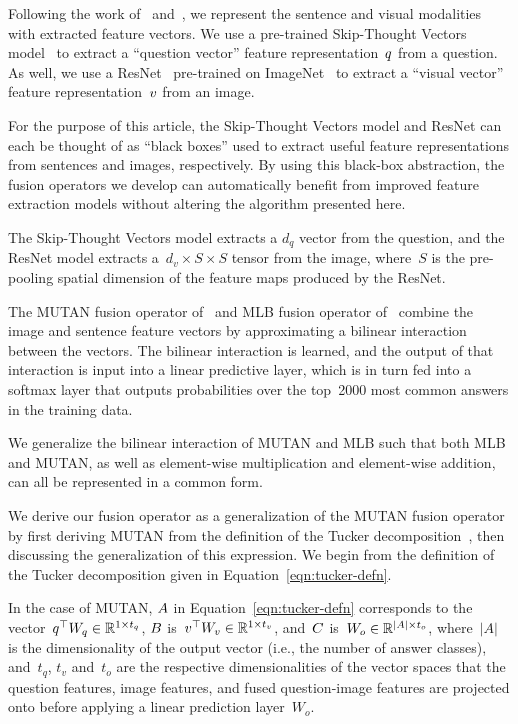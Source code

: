 Following the work of~\citet{Kim2017} and~\citet{ben2017mutan}, we represent the
sentence and visual modalities with extracted feature vectors. We use a
pre-trained Skip-Thought Vectors model~\citep{kiros2015skip}
to extract a ``question vector'' feature representation~$q$ from a question.
As well, we use a ResNet~\citep{he2016deep} pre-trained on
ImageNet~\citep{russakovsky2015imagenet} to extract a ``visual vector'' feature
representation~$v$ from an image.

For the purpose of this article, the Skip-Thought Vectors model and ResNet can
each be thought of as ``black boxes'' used to extract useful feature
representations from sentences and images, respectively. By using this
black-box abstraction, the fusion operators we develop can automatically
benefit from improved feature extraction models without altering the algorithm
presented here.

The Skip-Thought Vectors model extracts a $d_q$ vector from the question, and
the ResNet model extracts a~$d_v \times S \times S$ tensor from the image,
where~$S$ is the pre-pooling spatial dimension of the feature maps produced by
the ResNet.

The MUTAN fusion operator of~\citet{ben2017mutan} and MLB fusion operator
of~\citet{Kim2017} combine the image and sentence feature vectors by
approximating a bilinear interaction between the vectors. The bilinear
interaction is learned, and the output of that interaction is input into a
linear predictive layer, which is in turn fed into a softmax layer that outputs
probabilities over the top~\num{2000} most common answers in the training data.

We generalize the bilinear interaction of MUTAN and MLB such that both MLB and
MUTAN, as well as element-wise multiplication and element-wise addition, can
all be represented in a common form.

We derive our fusion operator as a generalization of the MUTAN fusion operator
by first deriving MUTAN from the definition of the Tucker
decomposition~\citep{kolda2009tensor}, then discussing the generalization of
this expression.  We begin from the definition of the Tucker decomposition
given in Equation~\ref{eqn:tucker-defn}.

In the case of MUTAN, $A$ in Equation~\ref{eqn:tucker-defn} corresponds to the
vector~$q^\top{} W_{q}{} \in \mathbb{R}^{1 \times t_q}$, $B$
is~$v^\top{} W_{v}{} \in \mathbb{R}^{1 \times t_v}$,
and~$C$ is~$W_o \in \mathbb{R}^{|A| \times t_o}$, where~$|A|$ is the
dimensionality of the output vector (i.e., the number of answer classes),
and~$t_q$, $t_v$ and~$t_o$ are the respective dimensionalities of the vector
spaces that the question features, image features, and fused question-image
features are projected onto before applying a linear prediction layer~$W_o$.

